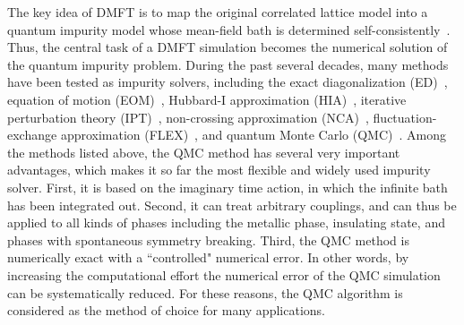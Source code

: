 The key idea of DMFT is to map the original correlated lattice model into a quantum impurity model whose mean-field bath is determined self-consistently~\cite{RevModPhys.68.13,RevModPhys.77.1027,RevModPhys.78.865}. Thus, the central task of a DMFT simulation becomes the numerical solution of the quantum impurity problem. During the past several decades, many methods have been tested as impurity solvers, including the exact diagonalization (ED)~\cite{PhysRevLett.72.1545}, equation of motion (EOM)~\cite{PhysRevB.50.7295}, Hubbard-I approximation (HIA)~\cite{PhysRevB.39.6962}, iterative perturbation theory (IPT)~\cite{PhysRevB.45.6479}, non-crossing approximation (NCA)~\cite{Grewe1983,Kuramoto1983,RevModPhys.59.845}, fluctuation-exchange approximation (FLEX)~\cite{Bickers1989206,PhysRevB.43.8044}, and quantum Monte Carlo (QMC)~\cite{PhysRevLett.56.2521,PhysRevLett.69.168}. Among the methods listed above, the QMC method has several very important advantages, which makes it so far the most flexible and widely used impurity solver. First, it is based on the imaginary time action, in which the infinite bath has been integrated out. Second, it can treat arbitrary couplings, and can thus be applied to all kinds of phases including the metallic phase, insulating state, and phases with spontaneous symmetry breaking. Third, the QMC method is numerically exact with a ``controlled" numerical error. In other words, by increasing the computational effort the numerical error of the QMC simulation can be systematically reduced. For these reasons, the QMC algorithm is considered as the method of choice for many applications.

